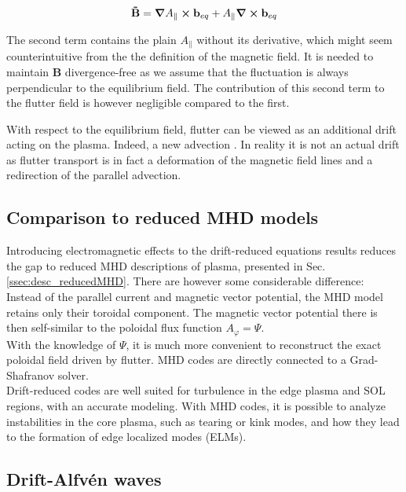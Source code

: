 \begin{equation}
	\mathbf{\tilde{B}} = \grad A_\parallel\cross\mathbf{b}_{eq} + A_\parallel \grad\cross \mathbf{b}_{eq}
\end{equation}

The second term contains the plain $A_\parallel$ without its derivative, which might seem counterintuitive from the the definition of the magnetic field. It is needed to maintain $\mathbf{B}$ divergence-free as we assume that the fluctuation is always perpendicular to the equilibrium field. The contribution of this second term to the flutter field is however negligible compared to the first.

With respect to the equilibrium field, flutter can be viewed as an additional drift acting on the plasma. Indeed, a new advection . In reality it is not an actual drift as flutter transport is in fact a deformation of the magnetic field lines and a redirection of the parallel advection. 


\subsection{Comparison to reduced MHD models}
\label{sec:edge_comparisonMHD}

Introducing electromagnetic effects to the drift-reduced equations results reduces the gap to reduced MHD descriptions of plasma, presented in Sec. \ref{ssec:desc_reducedMHD}. There are however some considerable difference: 
Instead of the parallel current and magnetic vector potential, the MHD model retains only their toroidal component. The magnetic vector potential there is then self-similar to the poloidal flux function $A_\varphi = \Psi$. \\

With the knowledge of $\Psi$, it is much more convenient to reconstruct the exact poloidal field driven by flutter. MHD codes are directly connected to a Grad-Shafranov solver. \\

Drift-reduced codes are well suited for turbulence in the edge plasma and SOL regions, with an accurate modeling. With MHD codes, it is possible to analyze instabilities in the core plasma, such as tearing or kink modes, and how they lead to the formation of edge localized modes (ELMs). 



\subsection{Drift-Alfvén waves}
\label{sec:edge_DAW}

